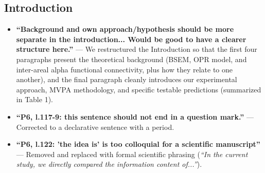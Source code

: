 \documentclass[11pt]{article}
\begin{document}
\subsection*{Introduction}
\begin{itemize}[leftmargin=1.5em]
    \item \textbf{``Background and own approach/hypothesis should be more separate in the introduction... Would be good to have a clearer structure here.''} --- \textcolor{revblue}{We restructured the Introduction so that the first four paragraphs present the theoretical background (BSEM, OPR model, and inter-areal alpha functional connectivity, plus how they relate to one another), and the final paragraph cleanly introduces our experimental approach, MVPA methodology, and specific testable predictions (summarized in Table 1).}
    \item \textbf{``P6, l.117-9: this sentence should not end in a question mark.''} --- \textcolor{revblue}{Corrected to a declarative sentence with a period.}
    \item \textbf{``P6, l.122: 'the idea is' is too colloquial for a scientific manuscript''} --- \textcolor{revblue}{Removed and replaced with formal scientific phrasing (\textit{``In the current study, we directly compared the information content of...''}).}
\end{itemize}
\end{document}
